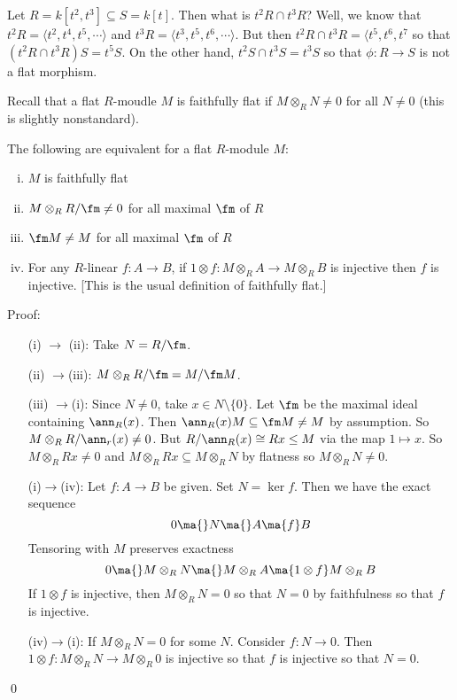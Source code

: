 \begin{ex}
Let $R=k[t^2,t^3] \subseteq S=k[t]$. Then what is $t^2 R \cap t^3R$? Well, we know that $t^2R=\langle t^2,t^4,t^5,\cdots \rangle$ and $t^3R=\langle t^3,t^5,t^6,\cdots \rangle$. But then $t^2R \cap t^3R=\langle t^5,t^6,t^7$ so that $(t^2R \cap t^3R)S=t^5S$. On the other hand, $t^2S \cap t^3S=t^3S$ so that $\phi: R \to S$ is not a flat morphism. 
\end{ex}

Recall that a flat $R$-moudle $M$ is faithfully flat if $M \otimes_R N \neq 0$ for all $N \neq 0$ (this is slightly nonstandard). 

\begin{prop}
The following are equivalent for a flat $R$-module $M$:
\begin{enumerate}[(i)]
\item $M$ is faithfully flat
\item $M \otimes_R R/\fm \neq 0$ for all maximal $\fm$ of $R$
\item $\fm M \neq M$ for all maximal $\fm$ of $R$
\item For any $R$-linear $f: A \to B$, if $1 \otimes f: M \otimes_R A \to M \otimes_R B$ is injective then $f$ is injective. [This is the usual definition of faithfully flat.]
\end{enumerate}
\end{prop}

\noindent Proof: 
\begin{enumerate}[(i)]
\item[(i) $\to$ (ii):] Take $N=R/\fm$.
\item[(ii) $\to$(iii):] $M \otimes_R R/\fm=M/\fm M$.
\item[(iii) $\to$(i):] Since $N \neq 0$, take $x \in N \setminus \{0\}$. Let $\fm$ be the maximal ideal containing $\ann_R(x)$. Then $\ann_R(x)M \subseteq \fm M \neq M$ by assumption. So $M \otimes_R R/\ann_r(x) \neq 0$. But $R/\ann_R(x) \cong Rx \leq M$ via the map $1 \mapsto x$. So $M \otimes_R Rx\neq 0$ and $M \otimes_R Rx \subseteq M \otimes_R N$ by flatness so $M \otimes_R N \neq 0$. 
\item[(i)$\to$(iv):] Let $f: A \to B$ be given. Set $N=\ker f$. Then we have the exact sequence
\[
0 \ma{} N \ma{} A \ma{f} B
\]
Tensoring with $M$ preserves exactness
\[
0 \ma{} M \otimes_R N \ma{} M \otimes_R A \ma{1 \otimes f} M \otimes_R B
\]
If $1 \otimes f$ is injective, then $M \otimes_R N=0$ so that $N=0$ by faithfulness so that $f$ is injective. 
\item[(iv)$\to$(i):] If $M \otimes_R N=0$ for some $N$. Consider $f: N \to 0$. Then $1 \otimes f: M \otimes_R N \to M \otimes_R 0$ is injective so that $f$ is injective so that $N=0$. 
\end{enumerate}
\qed \\

